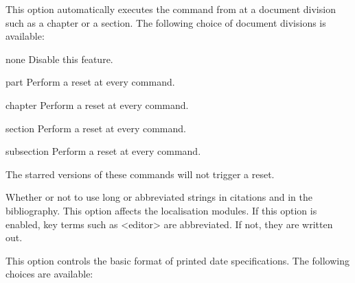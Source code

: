 \documentclass{ltxdockit}[2011/03/25]
\begin{document}
\begin{optionlist}

This option automatically executes the  command from  at a document division such as a chapter or a section. The following choice of document divisions is available:

\begin{valuelist}
\item[none] Disable this feature.
\item[part] Perform a reset at every  command.
\item[chapter] Perform a reset at every  command.
\item[section] Perform a reset at every  command.
\item[subsection] Perform a reset at every  command.
\end{valuelist}
%
The starred versions of these commands will not trigger a reset.


Whether or not to use long or abbreviated strings in citations and in the bibliography. This option affects the localisation modules. If this option is enabled, key terms such as <editor> are abbreviated. If not, they are written out.


This option controls the basic format of printed date specifications. The following choices are available:


\end{optionlist}
\end{document}
